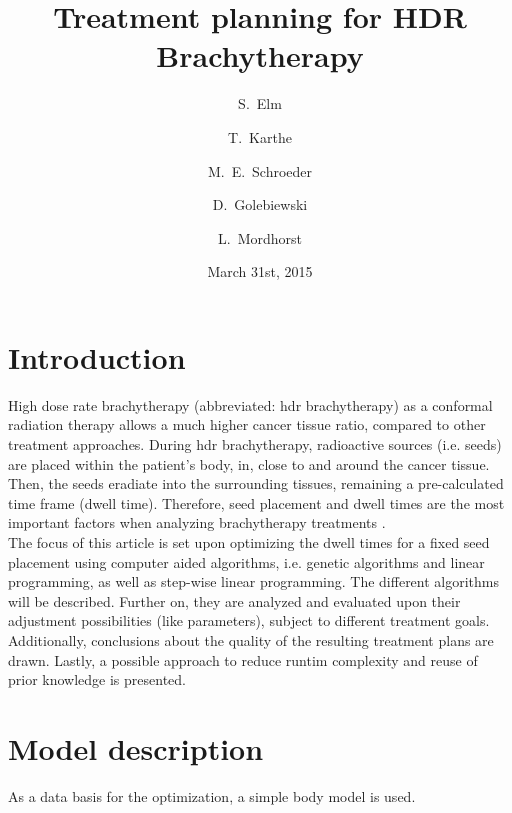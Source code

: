 \documentclass[12pt]{article}
\begin{document}
\title{Treatment planning for HDR Brachytherapy}
\date{March 31st, 2015}
\author{S.~Elm \and
T.~Karthe \and
M.~E.~Schroeder \and
D.~Golebiewski \and
L.~Mordhorst
}

\maketitle
\newpage

\tableofcontents
\newpage

\section{Introduction}
High dose rate brachytherapy (abbreviated: hdr brachytherapy) as a conformal radiation therapy allows a much higher cancer tissue ratio, compared to other treatment approaches. During hdr brachytherapy, radioactive sources (i.e. seeds) are placed within the patient's body, in, close to and around the cancer tissue. Then, the seeds eradiate into the surrounding tissues, remaining a pre-calculated time frame (dwell time). Therefore, seed placement and dwell times are the most important factors when analyzing brachytherapy treatments \cite{brachytherapy}. \\
The focus of this article is set upon optimizing the dwell times for a fixed seed placement using computer aided algorithms, i.e. genetic algorithms and linear programming, as well as step-wise linear programming. The different algorithms will be described. Further on, they are analyzed and evaluated upon their adjustment possibilities (like parameters), subject to different treatment goals. Additionally, conclusions about the quality of the resulting treatment plans are drawn. Lastly, a possible approach to reduce runtim complexity and reuse of prior knowledge is presented.

\section{Model description}
As a data basis for the optimization, a simple body model is used. 
\end{document}
